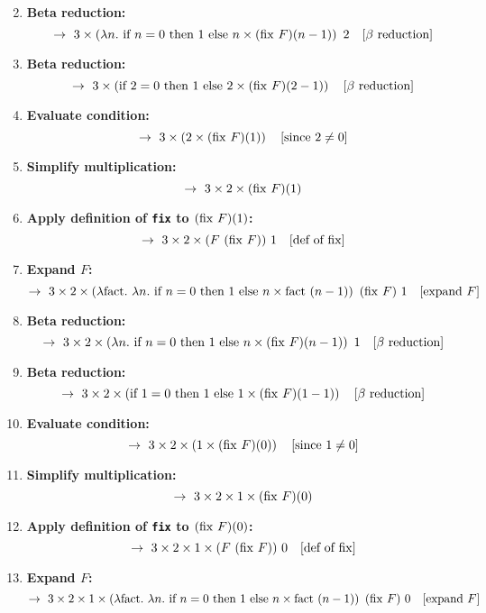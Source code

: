 \documentclass{article}
\theoremstyle{theorem}
\theoremstyle{definition}
\theoremstyle{remark}
\begin{document}
\begin{enumerate}
\[    \]
    \item \textbf{Beta reduction:}
    \[    \rightarrow\ 3 \times \left( \lambda n.\ \text{if } n = 0\ \text{then}\ 1\ \text{else}\ n \times (\fix\ F)(n - 1) \right)\ 2 \quad [\beta\ \text{reduction}]
    \]
    \item \textbf{Beta reduction:}
    \[    \rightarrow\ 3 \times \left( \text{if } 2 = 0\ \text{then}\ 1\ \text{else}\ 2 \times (\fix\ F)(2 - 1) \right) \quad [\beta\ \text{reduction}]
    \]
    \item \textbf{Evaluate condition:}
    \[    \rightarrow\ 3 \times \left( 2 \times (\fix\ F)(1) \right) \quad [\text{since } 2 \ne 0]
    \]
    \item \textbf{Simplify multiplication:}
    \[    \rightarrow\ 3 \times 2 \times (\fix\ F)(1)    \]
    \item \textbf{Apply definition of \texttt{fix} to \((\mathrm{fix}\ F)(1)\):}
    \[    \rightarrow\ 3 \times 2 \times (F\ (\mathrm{fix}\ F))\ 1 \quad [\text{def of } \mathrm{fix}]
    \]
    \item \textbf{Expand \( F \):}
    \[    \rightarrow\ 3 \times 2 \times \left( \lambda \text{fact}.\ \lambda n.\ \text{if } n = 0\ \text{then}\ 1\ \text{else}\ n \times \text{fact}\ (n - 1) \right)\ (\fix\ F)\ 1 \quad [\text{expand } F]
    \]
    \item \textbf{Beta reduction:}
    \[    \rightarrow\ 3 \times 2 \times \left( \lambda n.\ \text{if } n = 0\ \text{then}\ 1\ \text{else}\ n \times (\fix\ F)(n - 1) \right)\ 1 \quad [\beta\ \text{reduction}]
    \]
    \item \textbf{Beta reduction:}
    \[    \rightarrow\ 3 \times 2 \times \left( \text{if } 1 = 0\ \text{then}\ 1\ \text{else}\ 1 \times (\mathrm{fix}\ F)(1 - 1) \right) \quad [\beta\ \text{reduction}]
    \]
    \item \textbf{Evaluate condition:}
    \[    \rightarrow\ 3 \times 2 \times \left( 1 \times (\mathrm{fix}\ F)(0) \right) \quad [\text{since } 1 \ne 0]
    \]
    \item \textbf{Simplify multiplication:}
    \[    \rightarrow\ 3 \times 2 \times 1 \times (\fix\ F)(0)    \]
    \item \textbf{Apply definition of \texttt{fix} to \((\mathrm{fix}\ F)(0)\):}
    \[    \rightarrow\ 3 \times 2 \times 1 \times (F\ (\fix\ F))\ 0 \quad [\text{def of } \fix]
    \]
    \item \textbf{Expand \( F \):}
    \[    \rightarrow\ 3 \times 2 \times 1 \times \left( \lambda \text{fact}.\ \lambda n.\ \text{if } n = 0\ \text{then}\ 1\ \text{else}\ n \times \text{fact}\ (n - 1) \right)\ (\fix\ F)\ 0 \quad [\text{expand } F]
\]
\end{enumerate}
\end{document}
